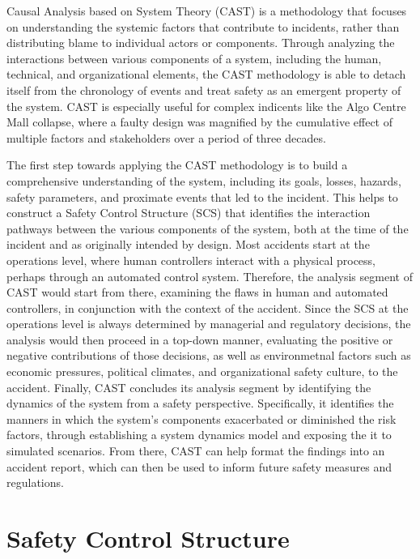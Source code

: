 \documentclass[12pt]{article}
\begin{document}
Causal Analysis based on System Theory (CAST) is a methodology that focuses on understanding the systemic factors that contribute to incidents, rather than distributing blame to individual actors or components. Through analyzing the interactions between various components of a system, including the human, technical, and organizational elements, the CAST methodology is able to detach itself from the chronology of events and treat safety as an emergent property of the system. CAST is especially useful for complex indicents like the Algo Centre Mall collapse, where a faulty design was magnified by the cumulative effect of multiple factors and stakeholders over a period of three decades. 

The first step towards applying the CAST methodology is to build a comprehensive understanding of the system, including its goals, losses, hazards, safety parameters, and proximate events that led to the incident. This helps to construct a Safety Control Structure (SCS) that identifies the interaction pathways between the various components of the system, both at the time of the incident and as originally intended by design. Most accidents start at the operations level, where human controllers interact with a physical process, perhaps through an automated control system. Therefore, the analysis segment of CAST would start from there, examining the flaws in human and automated controllers, in conjunction with the context of the accident. Since the SCS at the operations level is always determined by managerial and regulatory decisions, the analysis would then proceed in a top-down manner, evaluating the positive or negative contributions of those decisions, as well as environmetnal factors such as economic pressures, political climates, and organizational safety culture, to the accident. Finally, CAST concludes its analysis segment by identifying the dynamics of the system from a safety perspective. Specifically, it identifies the manners in which the system's components exacerbated or diminished the risk factors, through establishing a system dynamics model and exposing the it to simulated scenarios. From there, CAST can help format the findings into an accident report, which can then be used to inform future safety measures and regulations.

\section{Safety Control Structure}
\end{document}
